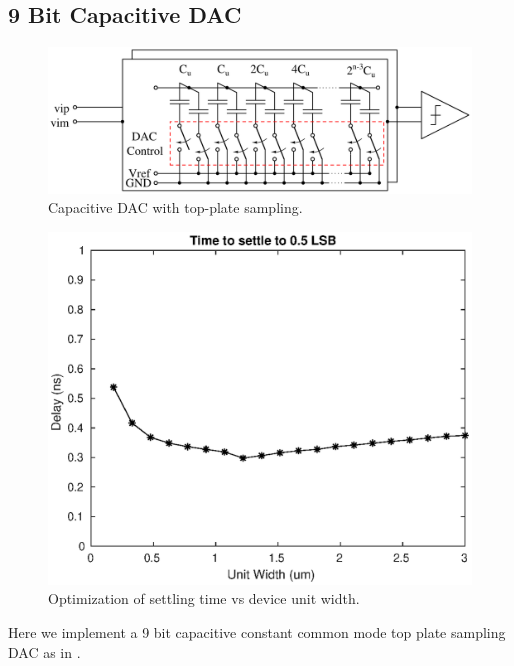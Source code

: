 \documentclass[10pt,journal]{IEEEtran}\usepackage{longtable}
\begin{document}
\subsection{9 Bit Capacitive DAC}
\begin{figure}[tbph]
\begin{center}
\includegraphics[width=1\columnwidth]{CapDacV3.pdf}
\caption{Capacitive DAC with top-plate sampling.}
\label{fig:CapDac}
\end{center}
\end{figure}
\begin{figure}[tbph]
\begin{center}
\includegraphics[width=1\columnwidth]{dac_optimization.eps}
\caption{Optimization of settling time vs device unit width.}
\label{fig:DacOptimization}
\end{center}
\end{figure}


Here we implement a 9 bit capacitive constant common mode top plate sampling DAC as in \cite{Tripathi:2013}.
\end{document}
